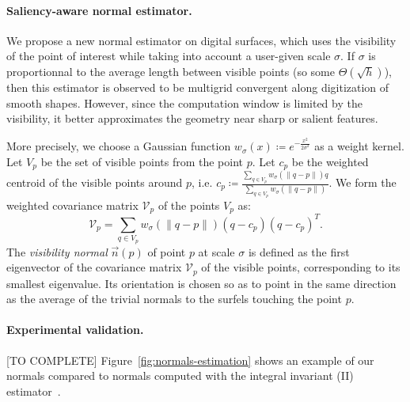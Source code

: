 \documentclass[runningheads]{llncs}
\begin{document}
    \newcommand{\Kernel}[1]{\ensuremath{w_{\sigma}(#1)}}

    \paragraph{Saliency-aware normal estimator.}
    We propose a new normal estimator on digital surfaces, which uses
    the visibility of the point of interest while taking into account
    a user-given scale $\sigma$. If $\sigma$ is proportionnal to the
    average length between visible points (so some
    $\Theta(\sqrt{h})$), then this estimator is observed to be
    multigrid convergent along digitization of smooth shapes. However,
    since the computation window is limited by the visibility, it
    better approximates the geometry near sharp or salient features.

    More precisely, we choose a Gaussian function
    $\Kernel{x}\coloneqq e^{-\frac{x^2}{2\sigma^2}}$ as a weight kernel. Let
    $V_p$ be the set of visible points from the point $p$. Let $c_p$
    be the weighted centroid of the visible points around $p$,
    i.e. $c_p \coloneqq \frac{\sum_{q \in V_p} \Kernel{\|q-p\|}q}{\sum_{q \in
    V_p} \Kernel{\|q-p\|}}$. We form the weighted covariance matrix
    $\mathcal{V}_p$ of the points $V_p$ as:
    \begin{equation}
        \mathcal{V}_p = \sum_{q \in V_p} \Kernel{\|q-p\|}(q - c_p)(q - c_p)^T.
    \end{equation}
    The \emph{visibility normal} $\vec{n}(p)$ of point $p$ at scale $\sigma$ is defined
    as the first eigenvector of the covariance matrix $\mathcal{V}_p$
    of the visible points, corresponding to its smallest
    eigenvalue. Its orientation is chosen so as to point in the same
    direction as the average of the trivial normals to the surfels
    touching the point $p$.


    \paragraph{Experimental validation.} [TO COMPLETE]
    Figure~\ref{fig:normals-estimation} shows an example
    of our normals compared to normals computed with the integral invariant (II) estimator~\cite{Lachaud:2017-lnm}.
\end{document}
